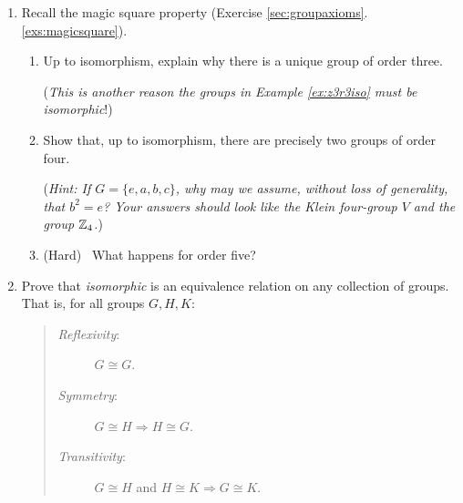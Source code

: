 \begin{exercises}{}
\begin{enumerate}
\begin{enumerate}
		  \item By considering the number of solutions to the equations in part (a), obtain a contradiction and hence conclude that $(\Q,+)\ncong(\Q^+,\cdot)$.
		\end{enumerate}
		(Extra challenge) \ Suppose $\phi:(\Q,+)\to(\R,\cdot)$ is a \emph{homomorphism} (of binary structures) and that $\phi(1)=a$: find a formula for $\phi(x)$.
			
	
		\item Recall the magic square property (Exercise \ref*{sec:groupaxioms}.\ref{exs:magicsquare}).
		\begin{enumerate}
		  \item Up to isomorphism, explain why there is a unique group of order three.\par
		  (\emph{This is another reason the groups in Example \ref{ex:z3r3iso} must be isomorphic}!)
		  
		  \item Show that, up to isomorphism, there are precisely two groups of order four.\par
			(\emph{Hint: If $G=\{e,a,b,c\}$, why may we assume, without loss of generality, that $b^2=e$? Your answers should look like the Klein four-group $V$ and the group $\mathbb{Z}_4$.})
			\item (Hard) \ What happens for order five?
		\end{enumerate}
			
			
		\item\label{exs:isomorphiccomposition} Prove that \emph{isomorphic} is an equivalence relation on any collection of groups. That is, for all groups $G,H,K$:
		\begin{quote}
			\begin{description}
			  \item[\emph{Reflexivity}:] $G\cong G$.
			  \item[\emph{Symmetry}:] $G\cong H\Longrightarrow H\cong G$.
			  \item[\emph{Transitivity}:] $G\cong H$ and $H\cong K\Longrightarrow G\cong K$.
			\end{description}
		\end{quote}
		
	\end{enumerate}
\end{exercises}